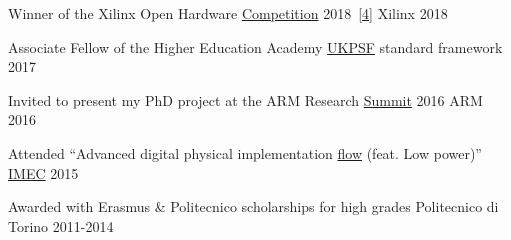 \vspace{-0.3mm}
\begin{cvhonors}

\cvhonor
{Winner of the Xilinx Open Hardware
{\color{myblue}\href{http://www.openhw.eu/2018-finalists.html}{Competition}}
2018~{\color{myblue}\href{https://youtu.be/Z2w0hiHY3Us}{[4]}}}
{Xilinx}
{}
{2018}

\cvhonor
{Associate Fellow of the Higher Education Academy} %
{{\color{myblue}\href{https://www.heacademy.ac.uk/ukpsf}{UKPSF}} standard 
framework} %
{} %
{2017} %

\cvhonor
{Invited to present my PhD project at the ARM Research
{\color{myblue}\href{https://developer.arm.com/research/summit/previous-summits/2016/speakers}{Summit}}
 2016}
{ARM}
{}
{2016}

\cvhonor
{Attended ``Advanced digital physical implementation
{\color{myblue}\href{http://www.europractice.stfc.ac.uk/training/training_flyers/adpi20171024.pdf}{flow}}
 (feat. Low power)''}
{\color{myblue}\href{https://www.imec-int.com/en/about-us}{IMEC}}
{}
{2015}

\cvhonor
{Awarded with Erasmus \& Politecnico scholarships for high grades}
{Politecnico di Torino}
{}
{2011-2014}


\end{cvhonors}